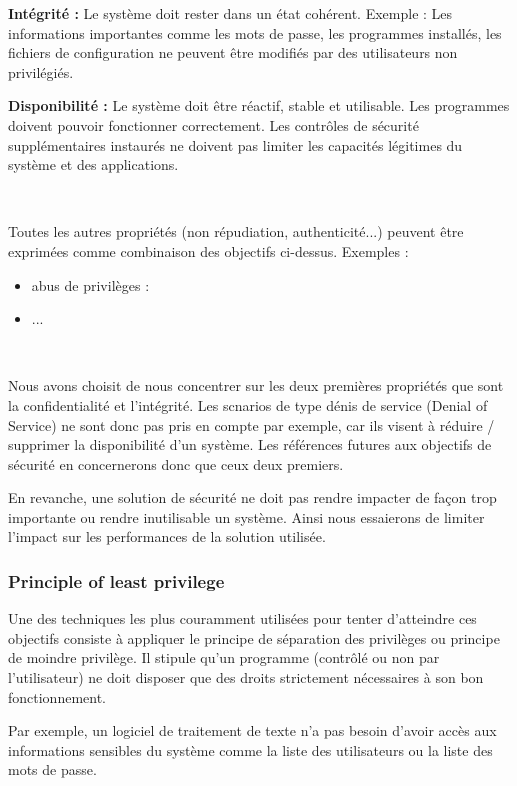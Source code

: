 \documentclass[pdftex,a4paper,titlepage,11pt]{article}
\begin{document}
\textbf{Intégrité :}
Le système doit rester dans un état cohérent. Exemple : Les informations importantes comme les mots de passe, les programmes installés, les fichiers de configuration ne peuvent être modifiés par des utilisateurs non privilégiés.

\textbf{Disponibilité :}
Le système doit être réactif, stable et utilisable. Les programmes doivent pouvoir fonctionner correctement. Les contrôles de sécurité supplémentaires instaurés ne doivent pas limiter les capacités légitimes du système et des applications.

~

Toutes les autres propriétés (non répudiation, authenticité...) peuvent être exprimées comme combinaison des objectifs ci-dessus. Exemples :
\begin{itemize}
	\item abus de privilèges :
	\item ...
\end{itemize}

~

Nous avons choisit de nous concentrer sur les deux premières propriétés que sont la confidentialité et l'intégrité. Les scnarios de type dénis de service (Denial of Service) ne sont donc pas pris en compte par exemple, car ils visent à réduire / supprimer la disponibilité d'un système. Les références futures aux objectifs de sécurité en concernerons donc que ceux deux premiers.

En revanche, une solution de sécurité ne doit pas rendre impacter de façon trop importante ou rendre inutilisable un système. Ainsi nous essaierons de limiter l'impact sur les performances de la solution utilisée.

\subsubsection{Principle of least privilege}

Une des techniques les plus couramment utilisées pour tenter d'atteindre ces objectifs consiste à appliquer le principe de séparation des privilèges ou principe de moindre privilège. Il stipule qu'un programme (contrôlé ou non par l'utilisateur) ne doit disposer que des droits strictement nécessaires à son bon fonctionnement.

Par exemple, un logiciel de traitement de texte n'a pas besoin d'avoir accès aux informations sensibles du système comme la liste des utilisateurs ou la liste des mots de passe.
\end{document}
